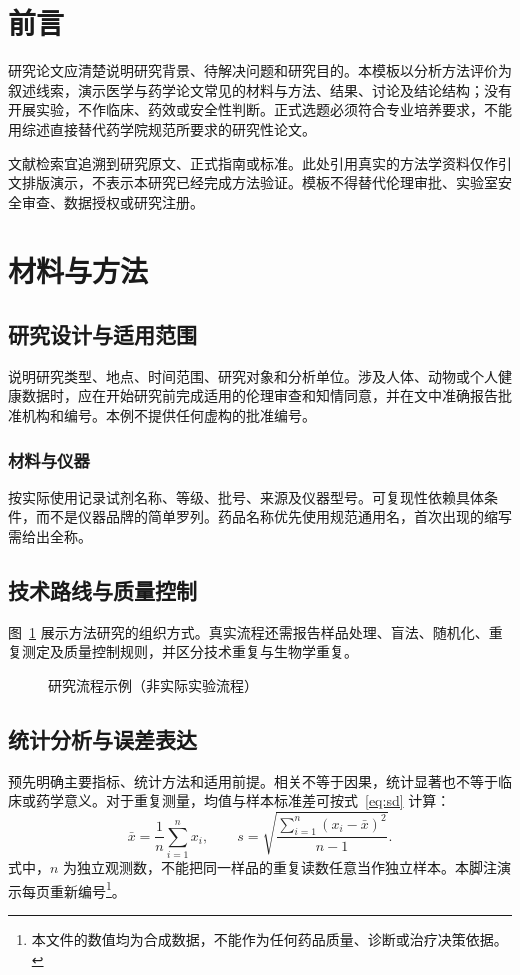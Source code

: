 \section*{前言}
研究论文应清楚说明研究背景、待解决问题和研究目的。本模板以分析方法评价为叙述线索，演示医学与药学论文常见的材料与方法、结果、讨论及结论结构；没有开展实验，不作临床、药效或安全性判断。正式选题必须符合专业培养要求，不能用综述直接替代药学院规范所要求的研究性论文。

文献检索宜追溯到研究原文、正式指南或标准。此处引用真实的方法学资料仅作引文排版演示\cite{ichq2,jcgm2008}，不表示本研究已经完成方法验证。模板不得替代伦理审批、实验室安全审查、数据授权或研究注册。
\section{材料与方法}
\subsection{研究设计与适用范围}
说明研究类型、地点、时间范围、研究对象和分析单位。涉及人体、动物或个人健康数据时，应在开始研究前完成适用的伦理审查和知情同意，并在文中准确报告批准机构和编号。本例不提供任何虚构的批准编号。
\subsubsection{材料与仪器}
按实际使用记录试剂名称、等级、批号、来源及仪器型号。可复现性依赖具体条件，而不是仪器品牌的简单罗列。药品名称优先使用规范通用名，首次出现的缩写需给出全称。
\subsection{技术路线与质量控制}
图~\ref{fig:workflow} 展示方法研究的组织方式。真实流程还需报告样品处理、盲法、随机化、重复测定及质量控制规则，并区分技术重复与生物学重复。
\begin{figure}[htbp]\centering
{}
\caption{研究流程示例（非实际实验流程）}\label{fig:workflow}
\end{figure}
\subsection{统计分析与误差表达}
预先明确主要指标、统计方法和适用前提。相关不等于因果，统计显著也不等于临床或药学意义。对于重复测量，均值与样本标准差可按式~\eqref{eq:sd} 计算：
\begin{equation}\label{eq:sd}
\bar{x}=\frac{1}{n}\sum_{i=1}^{n}x_i,\qquad s=\sqrt{\frac{\sum_{i=1}^{n}(x_i-\bar{x})^2}{n-1}}.
\end{equation}
式中，$n$ 为独立观测数，不能把同一样品的重复读数任意当作独立样本。本脚注演示每页重新编号\footnote{本文件的数值均为合成数据，不能作为任何药品质量、诊断或治疗决策依据。}。
